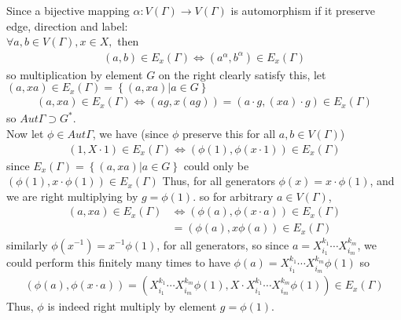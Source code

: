 \documentclass{article}
\begin{document}
\pagebreak


\begin{homeworkProblem}
    Since a bijective mapping $\alpha: V(\Gamma) \rightarrow V(\Gamma)$ is automorphism 
    if it preserve edge, direction and label:\\
    $\forall a,b \in V(\Gamma), x \in X,$ then 
    \begin{align}
        (a,b) \in E_x(\Gamma) \Leftrightarrow (a^{\alpha}, b^{\alpha}) \in E_x (\Gamma)
    \end{align}
    so multiplication by element $G$ on the right clearly satisfy this,
    let $(a, xa) \in E_x(\Gamma) = \left\{ (a, xa) | a \in G \right\}$
    \begin{align}
        (a, xa) \in E_x(\Gamma) \Leftrightarrow (ag, x(ag)) = (a \cdot g, (xa) \cdot g) \in E_x(\Gamma)
    \end{align}
    so $Aut \Gamma \supset G^{*}$.\\
    Now let $\phi \in Aut \Gamma$, we have (since $\phi$ preserve this for all $a,b \in V(\Gamma)$)
    \begin{align}
        (1, X \cdot 1) \in E_x (\Gamma) \Leftrightarrow (\phi(1), \phi(x \cdot 1)) \in E_x(\Gamma)
    \end{align}
    since $E_x(\Gamma) = \left\{ (a, xa) | a \in G\right\} $
    could only be $(\phi(1), x \cdot \phi(1)) \in E_x(\Gamma)$
    Thus, for all generators $\phi(x) = x \cdot \phi(1)$, and we are right multiplying by 
    $g = \phi(1)$. so for arbitrary $a \in V(\Gamma)$,
    \begin{align}
        (a, xa) \in E_x (\Gamma) &\Leftrightarrow (\phi(a), \phi(x \cdot a)) \in E_x (\Gamma)\\
        &= (\phi(a), x \phi(a)) \in E_x (\Gamma)
    \end{align}
    similarly $\phi (x^{-1}) = x^{-1} \phi(1)$, for all generators, 
    so since $a = X_{i_1}^{k_1} \cdots X_{i_m}^{k_m}$,
    we could perform this finitely many times to have 
    $\phi(a) = X_{i_1}^{k_1} \cdots X_{i_m}^{k_m} \phi(1)$ so
    \begin{align}
        (\phi(a), \phi(x \cdot a)) 
        = (X_{i_1}^{k_1} \cdots X_{i_m}^{k_m} \phi(1), X \cdot X_{i_1}^{k_1} \cdots X_{i_m}^{k_m} \phi(1)) 
        \in E_x(\Gamma)
    \end{align}
    Thus, $\phi$ is indeed right multiply by element $g = \phi(1)$.\\

    
    
    
    

    

\end{homeworkProblem}
\end{document}
